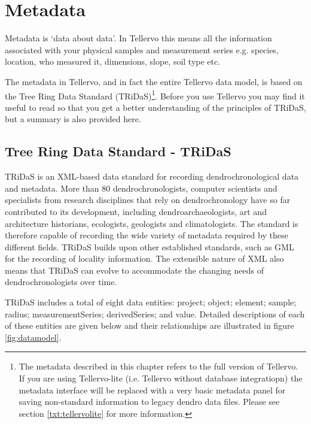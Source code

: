 \chapter{Metadata}
\label{txt:metadata}
Metadata is `data about data'. In Tellervo this means all the information associated with your physical samples and measurement series e.g. species, location, who measured it, dimensions, slope, soil type etc.

The metadata in Tellervo, and in fact the entire Tellervo data model, is based on the Tree Ring Data Standard (TRiDaS)\footnote{The metadata described in this chapter refers to the full version of Tellervo.  If you are using Tellervo-lite (i.e. Tellervo without database integratiopn) the metadata interface will be replaced with a very basic metadata panel for saving non-standard information to legacy dendro data files.  Please see section \ref{txt:tellervolite} for more information.}. Before you use Tellervo you may find it useful to read \citet{tridas} so that you get a better understanding of the principles of TRiDaS, but a summary is also provided here.

\section{Tree Ring Data Standard - TRiDaS}
TRiDaS is an XML-based data standard for recording dendrochronological data and metadata. More than 80 dendrochronologists, computer scientists and specialists from research disciplines that rely on dendrochronology have so far contributed to its development, including dendroarchaeologists, art and architecture historians, ecologists, geologists and climatologists.  The standard is therefore capable of recording the wide variety of metadata required by these different fields. TRiDaS builds upon other established standards, such as GML for the recording of locality information.  The extensible nature of XML also means that TRiDaS can evolve to accommodate the changing needs of dendrochronologists over time.  

TRiDaS includes a total of eight data entities: project; object; element; sample; radius; measurementSeries; derivedSeries; and value.  Detailed descriptions of each of these entities are given below and their relationships are illustrated in figure \ref{fig:datamodel}.

